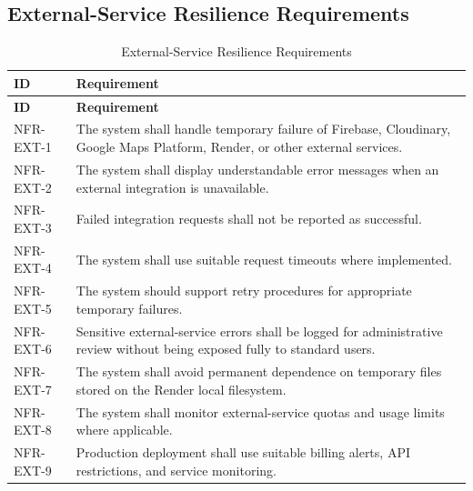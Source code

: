 \subsection{External-Service Resilience Requirements}
\begin{longtable}{@{}p{2.6cm}p{10.8cm}@{}}
\caption{External-Service Resilience Requirements} \label{tab:nfr-ext} \\
\toprule \textbf{ID} & \textbf{Requirement} \\ \midrule
\endfirsthead
\toprule \textbf{ID} & \textbf{Requirement} \\ \midrule
\endhead
NFR-EXT-1 & The system shall handle temporary failure of Firebase, Cloudinary, Google Maps Platform, Render, or other external services. \\
NFR-EXT-2 & The system shall display understandable error messages when an external integration is unavailable. \\
NFR-EXT-3 & Failed integration requests shall not be reported as successful. \\
NFR-EXT-4 & The system shall use suitable request timeouts where implemented. \\
NFR-EXT-5 & The system should support retry procedures for appropriate temporary failures. \\
NFR-EXT-6 & Sensitive external-service errors shall be logged for administrative review without being exposed fully to standard users. \\
NFR-EXT-7 & The system shall avoid permanent dependence on temporary files stored on the Render local filesystem. \\
NFR-EXT-8 & The system shall monitor external-service quotas and usage limits where applicable. \\
NFR-EXT-9 & Production deployment shall use suitable billing alerts, API restrictions, and service monitoring. \\
\bottomrule
\end{longtable}

